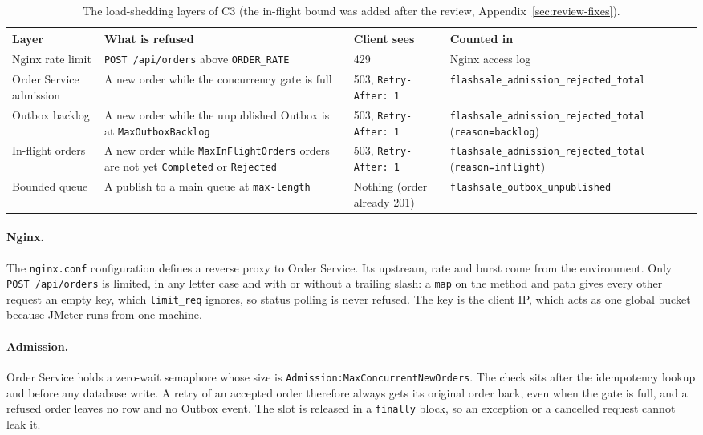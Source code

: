 \documentclass[a4paper]{report}
\begin{document}
\begin{table}[tbp]
\centering
\small
\begin{tabular}{p{}p{}p{}p{}}
\toprule
Layer & What is refused & Client sees & Counted in \\
\midrule
Nginx rate limit & \texttt{POST /api/orders} above \texttt{ORDER\_RATE} & 429 & Nginx access log \\
Order Service admission & A new order while the concurrency gate is full & 503, \texttt{Retry-After: 1} & \texttt{flashsale\_admission\_\allowbreak rejected\_total} \\
Outbox backlog & A new order while the unpublished Outbox is at \texttt{MaxOutboxBacklog} & 503, \texttt{Retry-After: 1} & \texttt{flashsale\_admission\_\allowbreak rejected\_total} (\texttt{reason=backlog}) \\
In-flight orders & A new order while \texttt{MaxInFlightOrders} orders are not yet \texttt{Completed} or \texttt{Rejected} & 503, \texttt{Retry-After: 1} & \texttt{flashsale\_admission\_\allowbreak rejected\_total} (\texttt{reason=inflight}) \\
Bounded queue & A publish to a main queue at \texttt{max-length} & Nothing (order already 201) & \texttt{flashsale\_outbox\_\allowbreak unpublished} \\
\bottomrule
\end{tabular}
\caption{The load-shedding layers of C3 (the in-flight bound was added after
the review, Appendix~\ref{sec:review-fixes}).}
\label{tab:load-shedding}
\end{table}

\paragraph{Nginx.} The \texttt{nginx.conf} configuration defines a reverse proxy
to Order Service. Its upstream, rate and burst come from the environment. Only
\texttt{POST /api/orders} is limited, in any letter case and with or without a
trailing slash: a \texttt{map} on the method and path gives every other request
an empty key, which \texttt{limit\_req} ignores, so status polling is never
refused. The key is the client IP, which acts as one global
bucket because JMeter runs from one machine.

\paragraph{Admission.} Order Service holds a zero-wait semaphore whose size is
\texttt{Admission:\allowbreak MaxConcurrent\allowbreak NewOrders}. The check sits after the
idempotency lookup and before any database write. A retry of an accepted order
therefore always gets its original order back, even when the gate is full, and a
refused order leaves no row and no Outbox event. The slot is released in a
\texttt{finally} block, so an exception or a cancelled request cannot leak it.
\end{document}
